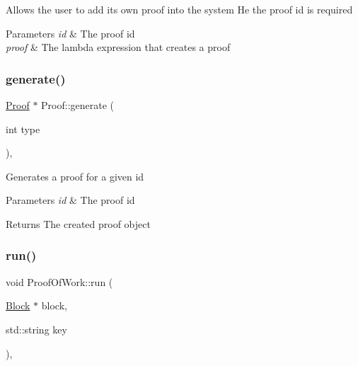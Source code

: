 Allows the user to add its own proof into the system He the proof id is required


\begin{DoxyParams}{Parameters}
{\em id} & The proof id \\
\hline
{\em proof} & The lambda expression that creates a proof \\
\hline
\end{DoxyParams}
\mbox{\label{classProof_a267f0f4587babb59884b5f280e2d54c8}} 
\subsubsection{\texorpdfstring{generate()}{generate()}}
{\footnotesize\ttfamily \mbox{\hyperlink{classProof}{Proof}} $\ast$ Proof\+::generate (\begin{DoxyParamCaption}\item[{int}]{type }\end{DoxyParamCaption})\hspace{0.3cm}{\ttfamily [static]}, {\ttfamily [inherited]}}

Generates a proof for a given id


\begin{DoxyParams}{Parameters}
{\em id} & The proof id \\
\hline
\end{DoxyParams}
\begin{DoxyReturn}{Returns}
The created proof object 
\end{DoxyReturn}
\mbox{\label{classProofOfWork_a80cbd012ee3f9e92a8497efac84bf689}} 
\subsubsection{\texorpdfstring{run()}{run()}}
{\footnotesize\ttfamily void Proof\+Of\+Work\+::run (\begin{DoxyParamCaption}\item[{\mbox{\hyperlink{classBlock}{Block}} $\ast$}]{block,  }\item[{std\+::string}]{key }\end{DoxyParamCaption})\hspace{0.3cm}{\ttfamily [override]}, {\ttfamily [virtual]}}

